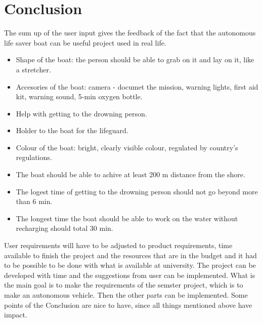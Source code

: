 \section*{Conclusion}
The sum up of the user input gives the feedback of the fact that the autonomous life saver boat can be useful project used in real life. 
\begin{itemize}
     \item Shape of the boat: the person should be able to grab on it and lay on it, like a stretcher.
     \item Accesories of the boat: camera - documet the mission, warning lights, first aid kit, warning sound, 5-min oxygen bottle.
     \item Help with getting to the drowning person.
     \item Holder to the boat for the lifeguard.
     \item Colour of the boat: bright, clearly visible colour, regulated by country's regulations.
     \item The boat should be able to achive at least 200 m distance from the shore.
     \item The logest time of getting to the drowning person should not go beyond more than 6 min.
     \item The longest time the boat should be able to work on the water without recharging should total 30 min.
\end{itemize}
User requirements will have to be adjusted to product requirements, time available to finish the project and the resources that are in the budget 
and it had to be possible to be done with what is available at university. The project can be developed with time and the suggestions from user can be 
implemented. What is the main goal is to make the requirements of the semster project, which is to make an autonomous vehicle. Then the 
other parts can be implemented. Some points of the Conclusion are nice to have, since all things mentioned above have impact.

